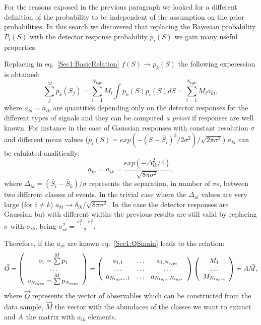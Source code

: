 For the reasons exposed in the previous paragraph we looked for a different
definition of the probability to be independent of the assumption on the prior
probabilities. In this search we discovered that replacing the Bayesian
probability $P_{i}(S)$ with the detector response probability $p_{i}(S)$ 
we gain many useful properties.

Replacing in eq.~\ref{Sec1:BasicRelation} $f(S) \rightarrow p_{k}(S)$ the
following experession is obtained:
\begin{equation}
\label{Sec1:QSmain}
\sum\limits_{j}^{M}p_{k}(S_j) = \sum\limits_{i=1}^{N_{type}}M_{i}\int p_{k}(S)
p_{i}(S) dS = \sum\limits_{i=1}^{N_{type}}M_{i} a_{ki}, 
\end{equation}
where $a_{ki}=a_{ik}$ are quantities depending only on the detector responses
for the different types of signals and they can be computed {\it a priori} if responses are well known.
For instance in the case of Gaussian responses with constant resolution
$\sigma$ and different mean values ($p_{i}(S) =
exp(-(S-\bar{S}_{i})^{2}/2\sigma^{2})/\sqrt{2\pi\sigma^{2}}$) $a_{ki}$ can
be calulated analitically:
\begin{equation}
\label{Sec1:GaussianMatrixElements}
a_{ki} = a_{ik} = \frac{exp(-\Delta_{ik}^{2}/4)}{\sqrt{8\pi\sigma^2}},
\end{equation}
where $\Delta_{ik}=(\bar{S}_{i} - \bar{S}_{k})/\sigma$ represents the
separation, in number of $\sigma$s, between two different classes of events.
In the trivial case where the $\Delta_{ik}$ values are very large (for $i \neq
k$) $a_{ki} \rightarrow \delta_{ik} / \sqrt{8\pi\sigma^2}$.
In the case the detector responses are Gaussian but with different
widths the previous results are still valid by replacing $\sigma$ with
$\sigma_{ik}$,  being $\sigma_{ik}^2 = \frac{\sigma_{i}^2 + \sigma_{j}^2}{2}$.

Therefore, if the $a_{ik}$ are known eq.~\ref{Sec1:QSmain} leads to the
relation:
\begin{equation}
\label{Sec1:QSformula}
\vec{O} =
 \left(
\begin{array}{c}
o_1 = \sum\limits^{M} p_{1}\\
\ldots \\
o_{N_{type}}=\sum\limits^{M} p_{N_{type}}
\end{array}
\right) =
\left(
\begin{array}{ccc}
a_{1,1} & \ldots & a_{1,N_{type}} \\
\ldots & \ldots & \ldots \\
a_{N_{types},1} & \ldots & a_{N_{type},N_{type}}
\end{array}
\right)
\left(
\begin{array}{c}
M_{1}\\
\ldots \\
M_{N_{types}}
\end{array}
\right) =
\boldmath{A} \vec{M},
\end{equation}
where $\vec{O}$ represents the vector of observables which can be constructed from the data
sample, $\vec{M}$ the vector with the abundaces of the classes we want to
extract and $\boldmath{A}$ the matrix with $a_{ik}$ elements.

